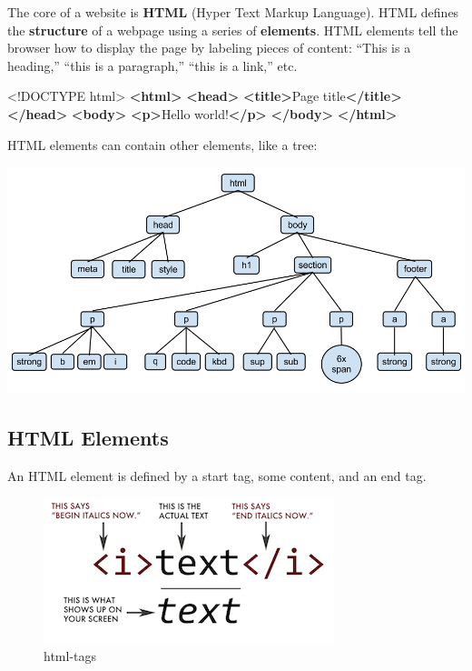 \documentclass[
]{book}
\newenvironment{Shaded}{\begin{snugshade}}{\end{snugshade}}
\newcommand{\DataTypeTok}[1]{\textcolor[rgb]{0.13,0.29,0.53}{#1}}
\newcommand{\KeywordTok}[1]{\textcolor[rgb]{0.13,0.29,0.53}{\textbf{#1}}}
\newcommand{\NormalTok}[1]{#1}
\begin{document}
The core of a website is \textbf{HTML} (Hyper Text Markup Language). HTML defines the \textbf{structure} of a webpage using a series of \textbf{elements}. HTML elements tell the browser how to display the page by labeling pieces of content: ``This is a heading,'' ``this is a paragraph,'' ``this is a link,'' etc.

\begin{Shaded}
\begin{Highlighting}[]
\DataTypeTok{<!DOCTYPE }\NormalTok{html}\DataTypeTok{>}
\KeywordTok{<html>}
    \KeywordTok{<head>}
        \KeywordTok{<title>}\NormalTok{Page title}\KeywordTok{</title>}
    \KeywordTok{</head>}
    \KeywordTok{<body>}
        \KeywordTok{<p>}\NormalTok{Hello world!}\KeywordTok{</p>}
    \KeywordTok{</body>}
\KeywordTok{</html>}
\end{Highlighting}
\end{Shaded}

HTML elements can contain other elements, like a tree:

\begin{center}\includegraphics[width=0.7\linewidth]{img/HTMLDOMTree} \end{center}

\hypertarget{html-elements}{%
\subsection{HTML Elements}\label{html-elements}}

An HTML element is defined by a start tag, some content, and an end tag.

\begin{figure}
\centering
\includegraphics{img/html-tags.png}
\caption{html-tags}
\end{figure}
\end{document}
